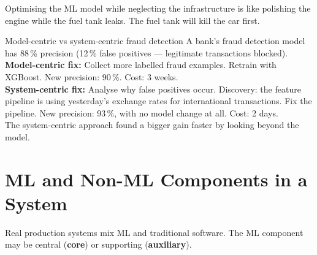 \documentclass[a4paper,11pt]{article}
\newcommand{\vocab}[1]{\textbf{\color{navy}#1}}
\begin{document}
\begin{center}
\end{center}

\begin{watchout}
Optimising the ML model while neglecting the infrastructure is like polishing the engine while the fuel tank leaks. The fuel tank will kill the car first.
\end{watchout}

\begin{worked}{Model-centric vs system-centric fraud detection}
A bank's fraud detection model has 88\,\% precision (12\,\% false positives --- legitimate transactions blocked). \\[4pt]
\textbf{Model-centric fix:} Collect more labelled fraud examples. Retrain with XGBoost. New precision: 90\,\%. Cost: 3 weeks. \\[4pt]
\textbf{System-centric fix:} Analyse why false positives occur. Discovery: the feature pipeline is using yesterday's exchange rates for international transactions. Fix the pipeline. New precision: 93\,\%, with no model change at all. Cost: 2 days. \\[4pt]
The system-centric approach found a bigger gain faster by looking beyond the model.
\end{worked}

\section{ML and Non-ML Components in a System}

Real production systems mix ML and traditional software. The ML component may be central (\vocab{core}) or supporting (\vocab{auxiliary}).
\end{document}
